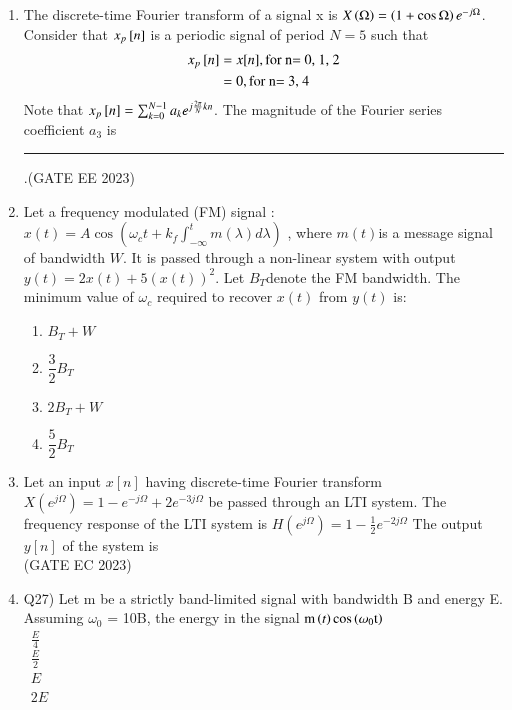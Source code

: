 \begin{enumerate}[label=\thechapter.\arabic*,ref=\thechapter.\theenumi]
    \item The discrete-time Fourier transform of a signal x is $X\left(\Omega\right)=\left(1+\cos{\Omega}\right)e^{-j\Omega}$. Consider that $x_{p}{}\left[n\right]$ is a periodic signal of period $N=5$ such that
        \begin{align}
            x_p{}\left[n\right]&=x[n],\text{for n= 0, 1, 2}\\
            &=0,\text{for n= 3, 4}
        \end{align}
        Note that $x_p{}\left[n\right]=\sum_{k=0}^{N-1}a_{k}e^{j\frac{2\pi}{N}kn}$. The magnitude of the Fourier series coefficient $a_3$ is \rule{3cm}{0.15mm} .\hfill(GATE EE 2023)
        \solution
        \newpage

\item Let a frequency modulated (FM) signal : $ x(t) = A \cos(\omega_c t + k_f \int_{-\infty}^{t} m(\lambda) d\lambda)$ , where $ m(t) $is a message signal of bandwidth $ W $. It is passed through a non-linear system with output $y(t) = 2x(t) + 5(x(t))^2 $.
Let $B_T $denote the FM bandwidth. The minimum value of $ \omega_c $ required to recover $ x(t) $ from $ y(t) $ is:\\
\begin{enumerate}[label = (\Alph*)]
\item $B_T + W$ \\
\item $\dfrac{3}{2} B_T$ \\
\item $2B_T + W$ \\
\item $\dfrac{5}{2} B_T$ \\
\end{enumerate}

\solution
\newpage

\item Let an input $x[n]$ having discrete-time Fourier transform
$X(e^{j\Omega}) = 1 - e^{-j\Omega} + 2e^{-3j\Omega}$
be passed through an LTI system. The frequency response of the LTI system is 
$H(e^{j\Omega}) = 1 - \frac{1}{2} e^{-2j\Omega}$
The output $y[n]$ of the system is \\ \hfill(GATE EC 2023)
\solution 
\newpage

\item Q27) Let m be a strictly band-limited signal with bandwidth B and energy E. Assuming $\omega_0$ = 10B, the energy in the signal $\text{m}\left(t\right)\text{cos}\left(\omega_0\text{t}\right)$\\[1ex]
\ $\frac{E}{4}$\\[1ex]
\ $\frac{E}{2}$\\[1ex]
\ $E$\\[1ex]
\ $2E$ \qquad\qquad\qquad\qquad\qquad\qquad\qquad\quad\qquad\qquad\qquad\qquad{}\\
\solution
\pagebreak
\end{enumerate}
